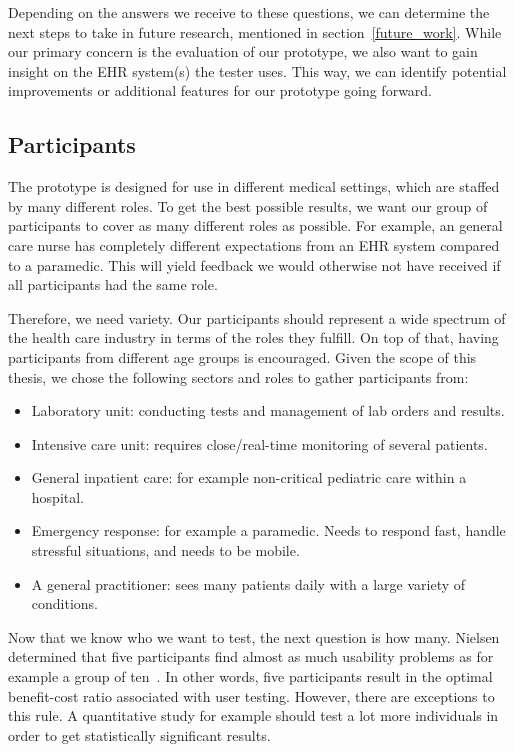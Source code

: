    \noindent Depending on the answers we receive to these questions, we can determine the next steps to take in future research, mentioned in section~\ref{future_work}. While our primary concern is the evaluation of our prototype, we also want to gain insight on the EHR system(s) the tester uses. This way, we can identify potential improvements or additional features for our prototype going forward. %

    \subsection{Participants}\label{test_participants}

    The prototype is designed for use in different medical settings, which are staffed by many different roles. To get the best possible results, we want our group of participants to cover as many different roles as possible. For example, an general care nurse has completely different expectations from an EHR system compared to a paramedic. This will yield feedback we would otherwise not have received if all participants had the same role.

    Therefore, we need variety. Our participants should represent a wide spectrum of the health care industry in terms of the roles they fulfill. On top of that, having participants from different age groups is encouraged. Given the scope of this thesis, we chose the following sectors and roles to gather participants from:
    \begin{itemize}
        \item Laboratory unit: conducting tests and management of lab orders and results.
        \item Intensive care unit: requires close/real-time monitoring of several patients.
        \item General inpatient care: for example non-critical pediatric care within a hospital.
        \item Emergency response: for example a paramedic. Needs to respond fast, handle stressful situations, and needs to be mobile.
        \item A general practitioner: sees many patients daily with a large variety of conditions.
    \end{itemize}

    \noindent Now that we know who we want to test, the next question is how many. Nielsen determined that five participants find almost as much usability problems as for example a group of ten~\cite{Nielsen2012}. In other words, five participants result in the optimal benefit-cost ratio associated with user testing. However, there are exceptions to this rule. A quantitative study for example should test a lot more individuals in order to get statistically significant results.

